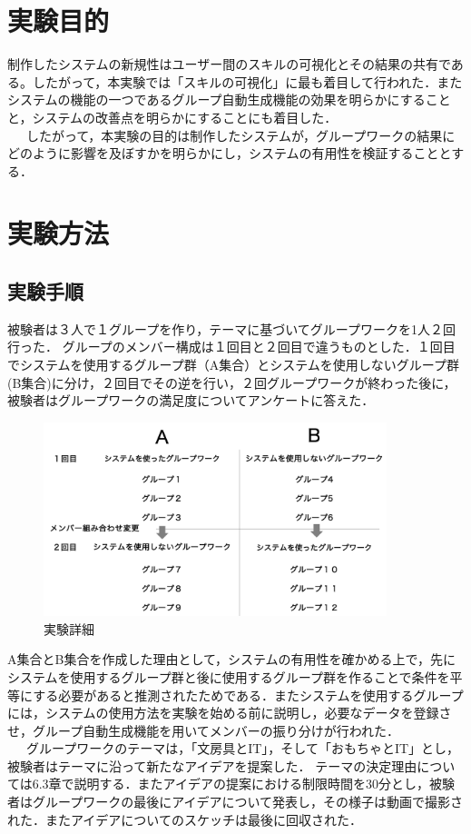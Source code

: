 \documentclass{funthesis}
\begin{document}
\section{実験目的}
制作したシステムの新規性はユーザー間のスキルの可視化とその結果の共有である。したがって，本実験では「スキルの可視化」に最も着目して行われた．またシステムの機能の一つであるグループ自動生成機能の効果を明らかにすることと，システムの改善点を明らかにすることにも着目した．\\
\ \ \ したがって，本実験の目的は制作したシステムが，グループワークの結果にどのように影響を及ぼすかを明らかにし，システムの有用性を検証することとする．
\section{実験方法}
\subsection{実験手順}
被験者は３人で１グループを作り，テーマに基づいてグループワークを1人２回行った．
グループのメンバー構成は１回目と２回目で違うものとした．１回目でシステムを使用するグループ群（A集合）とシステムを使用しないグループ群(B集合)に分け，２回目でその逆を行い，２回グループワークが終わった後に，被験者はグループワークの満足度についてアンケートに答えた．

\begin{figure}[H]
 \centering
   \includegraphics[width=100mm]{figures/zikken1.png}
 \caption{実験詳細}
 \label{zikken1}
\end{figure}

A集合とB集合を作成した理由として，システムの有用性を確かめる上で，先にシステムを使用するグループ群と後に使用するグループ群を作ることで条件を平等にする必要があると推測されたためである．またシステムを使用するグループには，システムの使用方法を実験を始める前に説明し，必要なデータを登録させ，グループ自動生成機能を用いてメンバーの振り分けが行われた．\\
\ \ \ グループワークのテーマは，「文房具とIT」，そして「おもちゃとIT」とし，被験者はテーマに沿って新たなアイデアを提案した．
テーマの決定理由については6.3章で説明する．またアイデアの提案における制限時間を30分とし，被験者はグループワークの最後にアイデアについて発表し，その様子は動画で撮影された．またアイデアについてのスケッチは最後に回収された．
\end{document}
